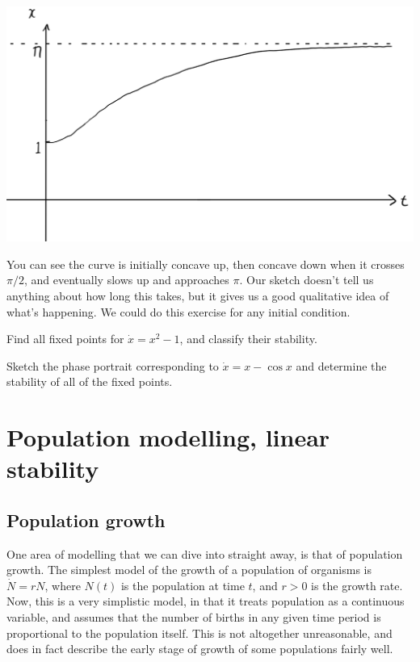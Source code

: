 \begin{center}
    \includegraphics[width=\linewidth]{figs/sintrajectory}
\end{center}

You can see the curve is initially concave up, then concave down when it
crosses $\pi/2$, and eventually slows up and approaches $\pi$. Our sketch
doesn't tell us anything about how long this takes, but it gives us a good
qualitative idea of what's happening. We could do this exercise for any
initial condition.

\begin{example}
    Find all fixed points for $\dot x = x^2 - 1$, and classify their
    stability.
\end{example}

\begin{example}
    Sketch the phase portrait corresponding to $\dot x = x - \cos x$ and
    determine the stability of all of the fixed points.
\end{example}

\chapter{Population modelling, linear stability}
\section{Population growth}
One area of modelling that we can dive into straight away, is that of
population growth. The simplest model of the growth of a population of
organisms is $\dot N = rN$, where $N(t)$ is the population at time $t$, and
$r > 0$ is the growth rate. Now, this is a very simplistic model, in that
it treats population as a continuous variable, and assumes that the number
of births in any given time period is proportional to the population
itself. This is not altogether unreasonable, and does in fact describe the
early stage of growth of some populations fairly well. 

